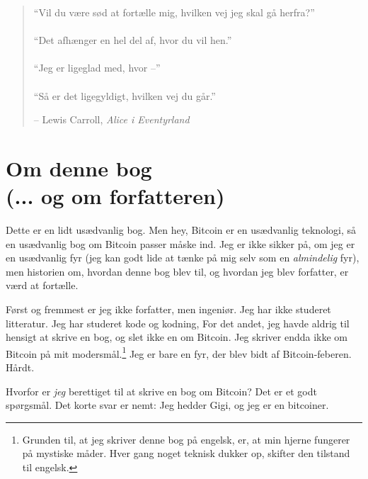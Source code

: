 \documentclass[paper=6in:9in,pagesize=pdftex,
               headinclude=on,footinclude=on,12pt]{scrbook}
\begin{document}
\newpage \vspace*{4cm}
\thispagestyle{empty}
\begin{quotation}
\begin{center}
  \large \enquote{Vil du være sød at fortælle mig, hvilken vej jeg skal gå herfra?} \\~\\ \enquote{Det afhænger en hel del af, hvor du vil hen.} \\~\\ \enquote{Jeg er ligeglad med, hvor --} \\~\\ \enquote{Så er det ligegyldigt, hvilken vej du går.} \end{center}
\begin{flushright} -- Lewis Carroll, \textit{Alice i Eventyrland}\end{flushright}
\end{quotation}

\tableofcontents

\def\bitcoinB{\leavevmode{\setbox0=\hbox{\textsf{B}}%
    \dimen0\ht0 \advance\dimen0 0.2ex
    \ooalign{\hfil \box0\hfil\cr
      \hfil\vrule height \dimen0 depth.2ex\hfil\cr
    }%
  }%
}

\chapter*{Om denne bog \\ (... og om forfatteren)}

Dette er en lidt usædvanlig bog. Men hey, Bitcoin er en usædvanlig teknologi, så en usædvanlig bog om Bitcoin passer måske ind. Jeg er ikke sikker på, om jeg er en usædvanlig fyr (jeg kan godt lide at tænke på mig selv som en \textit{almindelig} fyr), men historien om, hvordan denne bog blev til, og hvordan jeg blev forfatter, er værd at fortælle.

Først og fremmest er jeg ikke forfatter, men ingeniør. Jeg har ikke studeret litteratur. Jeg har studeret kode og kodning, For det andet, jeg havde aldrig til hensigt at skrive en bog, og slet ikke en om Bitcoin. Jeg skriver endda ikke om Bitcoin på mit modersmål.\footnote{Grunden til, at jeg skriver denne bog på engelsk, er, at min hjerne fungerer på mystiske måder. Hver gang noget teknisk dukker op, skifter den tilstand til engelsk.} Jeg er bare en fyr, der blev bidt af Bitcoin-feberen. Hårdt.

Hvorfor er \textit{jeg} berettiget til at skrive en bog om Bitcoin? Det er et godt spørgsmål. Det korte svar er nemt: Jeg hedder Gigi, og jeg er en bitcoiner.
\end{document}
